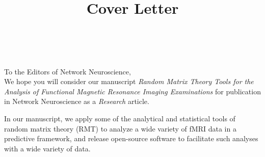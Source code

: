 \documentclass{article}
\begin{document}

\thispagestyle{fancy}
\normalsize

\title{Cover Letter}





~\\~\\
To the Editors of Network Neuroscience, \\

We hope you will consider our manuscript \emph{Random Matrix Theory Tools for the Analysis of
Functional Magnetic Resonance Imaging Examinations} for publication in Network Neuroscience as a
\emph{Research} article.

In our manuscript, we apply some of the analytical and statistical tools of random matrix theory
(RMT) to analyze a wide variety of fMRI data in a predictive framework, and release open-source
software to facilitate such analyses with a wide variety of data.
\end{document}
